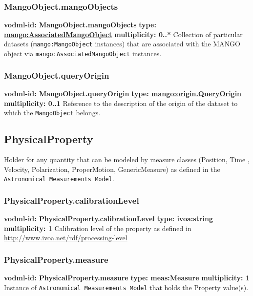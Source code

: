     \subsubsection{MangoObject.mangoObjects}
      \textbf{vodml-id: MangoObject.mangoObjects} \newline
      \textbf{type: \hyperref[sect:AssociatedMangoObject]{mango:AssociatedMangoObject}} \newline
      \textbf{multiplicity: 0..*} \newline
      Collection of particular datasets (\texttt{mango:MangoObject} instances) that are associated with the MANGO object via \texttt{mango:AssociatedMangoObject} instances.

    \subsubsection{MangoObject.queryOrigin}
      \textbf{vodml-id: MangoObject.queryOrigin} \newline
      \textbf{type: \hyperref[sect:origin.QueryOrigin]{mango:origin.QueryOrigin}} \newline
      \textbf{multiplicity: 0..1} \newline
      Reference to the description of the origin of the dataset to which the \texttt{MangoObject} belongs.

  \subsection{PhysicalProperty}
  \label{sect:PhysicalProperty}
    Holder for any quantity that can be modeled by measure classes (Position, Time , Velocity, Polarization, ProperMotion, GenericMeasure) as defined in the \texttt{Astronomical Measurements Model}.

    \subsubsection{PhysicalProperty.calibrationLevel}
      \textbf{vodml-id: PhysicalProperty.calibrationLevel} \newline
      \textbf{type: \hyperref[sect:ivoa]{ivoa:string}} \newline
      \textbf{multiplicity: 1} \newline
      Calibration level of the property as defined in \url{http://www.ivoa.net/rdf/processing-level}

    \subsubsection{PhysicalProperty.measure}
      \textbf{vodml-id: PhysicalProperty.measure} \newline
      \textbf{type: meas:Measure} \newline
      \textbf{multiplicity: 1} \newline
      Instance of \texttt{Astronomical Measurements Model} that holds the Property value(s).

